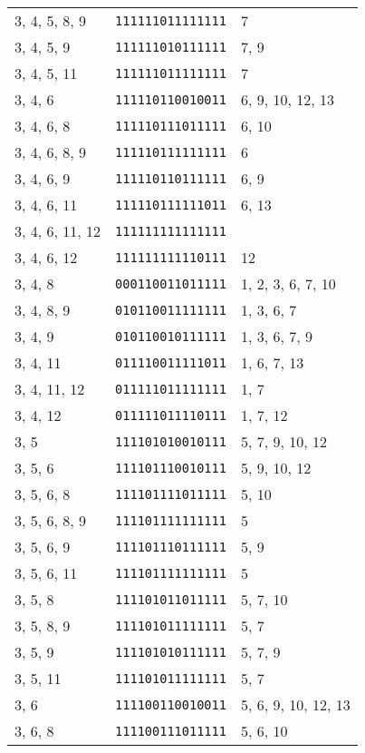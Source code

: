 \documentclass[a4paper,12pt]{article}
\begin{document}
\begin{longtable}{l|l|l}
        3, 4, 5, 8, 9&\texttt{111111011111111}&7\\
        3, 4, 5, 9&\texttt{111111010111111}&7, 9\\
        3, 4, 5, 11&\texttt{111111011111111}&7\\
        3, 4, 6&\texttt{111110110010011}&6, 9, 10, 12, 13\\
        3, 4, 6, 8&\texttt{111110111011111}&6, 10\\
        3, 4, 6, 8, 9&\texttt{111110111111111}&6\\
        3, 4, 6, 9&\texttt{111110110111111}&6, 9\\
        3, 4, 6, 11&\texttt{111110111111011}&6, 13\\
        3, 4, 6, 11, 12&\texttt{111111111111111}&\\
        3, 4, 6, 12&\texttt{111111111110111}&12\\
        3, 4, 8&\texttt{000110011011111}&1, 2, 3, 6, 7, 10\\
        3, 4, 8, 9&\texttt{010110011111111}&1, 3, 6, 7\\
        3, 4, 9&\texttt{010110010111111}&1, 3, 6, 7, 9\\
        3, 4, 11&\texttt{011110011111011}&1, 6, 7, 13\\
        3, 4, 11, 12&\texttt{011111011111111}&1, 7\\
        3, 4, 12&\texttt{011111011110111}&1, 7, 12\\
        3, 5&\texttt{111101010010111}&5, 7, 9, 10, 12\\
        3, 5, 6&\texttt{111101110010111}&5, 9, 10, 12\\
        3, 5, 6, 8&\texttt{111101111011111}&5, 10\\
        3, 5, 6, 8, 9&\texttt{111101111111111}&5\\
        3, 5, 6, 9&\texttt{111101110111111}&5, 9\\
        3, 5, 6, 11&\texttt{111101111111111}&5\\
        3, 5, 8&\texttt{111101011011111}&5, 7, 10\\
        3, 5, 8, 9&\texttt{111101011111111}&5, 7\\
        3, 5, 9&\texttt{111101010111111}&5, 7, 9\\
        3, 5, 11&\texttt{111101011111111}&5, 7\\
        3, 6&\texttt{111100110010011}&5, 6, 9, 10, 12, 13\\
        3, 6, 8&\texttt{111100111011111}&5, 6, 10\\

\end{longtable}
\end{document}

